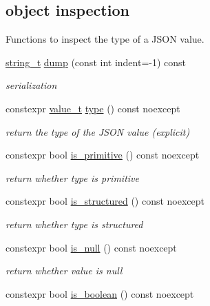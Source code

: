 \subsection*{object inspection}
\label{_amgrpbbb01a37b8f261ae5b5799058dcac1a0}%
Functions to inspect the type of a J\+S\+O\+N value. \begin{DoxyCompactItemize}
\item 
\hyperlink{classnlohmann_1_1basic__json_ab63e618bbb0371042b1bec17f5891f42}{string\+\_\+t} \hyperlink{classnlohmann_1_1basic__json_a805e3f3a2f374da0e14942eec7400e40}{dump} (const int indent=-\/1) const 
\begin{DoxyCompactList}\small\item\em serialization \end{DoxyCompactList}\item 
constexpr \hyperlink{classnlohmann_1_1basic__json_a231b02148577b69a154b2ce2c87a5522}{value\+\_\+t} \hyperlink{classnlohmann_1_1basic__json_a848cbae3bd3502ffbf738320bf5eb3aa}{type} () const  noexcept
\begin{DoxyCompactList}\small\item\em return the type of the J\+S\+O\+N value (explicit) \end{DoxyCompactList}\item 
constexpr bool \hyperlink{classnlohmann_1_1basic__json_a7c774ef0eceff6d06095f617e2dbd488}{is\+\_\+primitive} () const  noexcept
\begin{DoxyCompactList}\small\item\em return whether type is primitive \end{DoxyCompactList}\item 
constexpr bool \hyperlink{classnlohmann_1_1basic__json_a558b345044c38a9f6ad522592cc700c8}{is\+\_\+structured} () const  noexcept
\begin{DoxyCompactList}\small\item\em return whether type is structured \end{DoxyCompactList}\item 
constexpr bool \hyperlink{classnlohmann_1_1basic__json_a685d9d6a8a45bfcb8455b147257cdffb}{is\+\_\+null} () const  noexcept
\begin{DoxyCompactList}\small\item\em return whether value is null \end{DoxyCompactList}\item 
constexpr bool \hyperlink{classnlohmann_1_1basic__json_a8f7e67d903f918cd08261219fb47a9f0}{is\+\_\+boolean} () const  noexcept

\end{DoxyCompactItemize}
